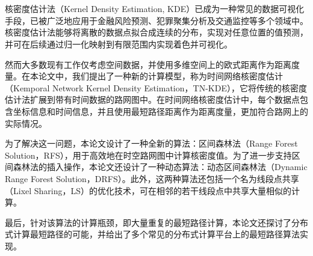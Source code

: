 \vspace{-2.5cm}
\chapter*{\xiaosan {}}
\hspace{-0.5cm}

核密度估计法（Kernel Density Estimation, KDE）已成为一种常见的数据可视化手段，已被广泛地应用于金融风险预测、犯罪聚集分析及交通监控等多个领域中。核密度估计法能够将离散的数据点拟合成连续的分布，实现对任意位置的值预测，并可在后续通过归一化映射到有限范围内实现着色并可视化。

然而大多数现有工作仅考虑空间数据，并使用多维空间上的欧式距离作为距离度量。在本论文中，我们提出了一种新的计算模型，称为时间网络核密度估计（Kemporal Network Kernel Density Estimation，TN-KDE），它将传统的核密度估计法扩展到带有时间数据的路网图中。在时间网络核密度估计中，每个数据点包含坐标信息和时间信息，并且使用最短路径距离作为距离度量，更加符合路网上的实际情况。

为了解决这一问题，本论文设计了一种全新的算法：区间森林法（Range Forest Solution，RFS），用于高效地在时空路网图中计算核密度值。为了进一步支持区间森林法的插入操作，本论文还设计了一种动态算法：动态区间森林法（Dynamic Range Forest Solution，DRFS）。此外，这两种算法还包括一个名为线段点共享（Lixel Sharing，LS）的优化技术，可在相邻的若干线段点中共享大量相似的计算。

最后，针对该算法的计算瓶颈，即大量重复的最短路径计算，本论文还探讨了分布式计算最短路径的可能，并给出了多个常见的分布式计算平台上的最短路径算法实现。


 